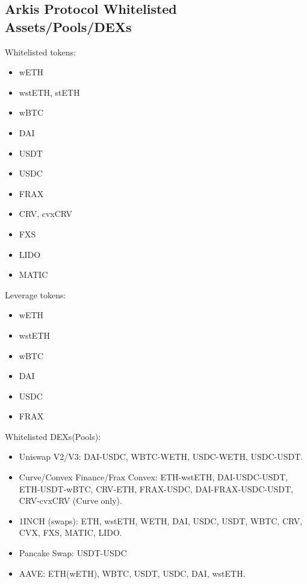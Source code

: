 \documentclass[conference]{IEEEtran}
\begin{document}
\begin{appendices}
\section{Arkis Protocol Whitelisted Assets/Pools/DEXs}
Whitelisted tokens:
\begin{itemize}
	\item wETH
	\item wstETH, stETH
	\item wBTC
	\item DAI
	\item USDT
	\item USDC
	\item FRAX
	\item CRV, cvxCRV
	\item FXS
	\item LIDO
	\item MATIC
\end{itemize}
Leverage tokens: 
\begin{itemize}
	\item wETH
	\item wstETH
	\item wBTC
	\item DAI
	\item USDC
	\item FRAX
\end{itemize}
Whitelisted DEXs(Pools):
\begin{itemize}
	\item Uniswap V2/V3: DAI-USDC, WBTC-WETH, USDC-WETH, USDC-USDT.
	\item Curve/Convex Finance/Frax Convex: ETH-wstETH, DAI-USDC-USDT, ETH-USDT-wBTC, CRV-ETH, FRAX-USDC, DAI-FRAX-USDC-USDT, CRV-cvxCRV (Curve only).
	\item 1INCH (swaps): ETH, wstETH, WETH, DAI, USDC, USDT, WBTC, CRV, CVX, FXS, MATIC, LIDO.
	\item Pancake Swap: USDT-USDC
	\item AAVE: ETH(wETH), WBTC, USDT, USDC, DAI, wstETH.
\end{itemize}




\end{appendices}
\end{document}
